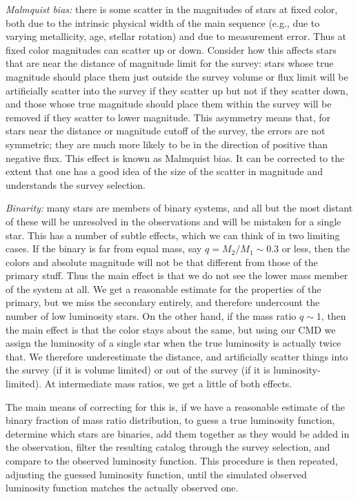 \textit{Malmquist bias:} there is some scatter in the magnitudes of stars at fixed color, both due to the intrinsic physical width of the main sequence (e.g., due to varying metallicity, age, stellar rotation) and due to measurement error. Thus at fixed color magnitudes can scatter up or down. Consider how this affects stars that are near the distance of magnitude limit for the survey: stars whose true magnitude should place them just outside the survey volume or flux limit will be artificially scatter into the survey if they scatter up but not if they scatter down, and those whose true magnitude should place them within the survey will be removed if they scatter to lower magnitude. This asymmetry means that, for stars near the distance or magnitude cutoff of the survey, the errors are not symmetric; they are much more likely to be in the direction of positive than negative flux. This effect is known as Malmquist bias. It can be corrected to the extent that one has a good idea of the size of the scatter in magnitude and understands the survey selection.

\textit{Binarity:} many stars are members of binary systems, and all but the most distant of these will be unresolved in the observations and will be mistaken for a single star. This has a number of subtle effects, which we can think of in two limiting cases. If the binary is far from equal mass, say $q = M_2/M_1 \sim 0.3$ or less, then the colors and absolute magnitude will not be that different from those of the primary stuff. Thus the main effect is that we do not see the lower mass member of the system at all. We get a reasonable estimate for the properties of the primary, but we miss the secondary entirely, and therefore undercount the number of low luminosity stars. On the other hand, if the mass ratio $q\sim 1$, then the main effect is that the color stays about the same, but using our CMD we assign the luminosity of a single star when the true luminosity is actually twice that. We therefore underestimate the distance, and artificially scatter things into the survey (if it is volume limited) or out of the survey (if it is luminosity-limited). At intermediate mass ratios, we get a little of both effects.

The main means of correcting for this is, if we have a reasonable estimate of the binary fraction of mass ratio distribution, to guess a true luminosity function, determine which stars are binaries, add them together as they would be added in the observation, filter the resulting catalog through the survey selection, and compare to the observed luminosity function. This procedure is then repeated, adjusting the guessed luminosity function, until the simulated observed luminosity function matches the actually observed one. 

